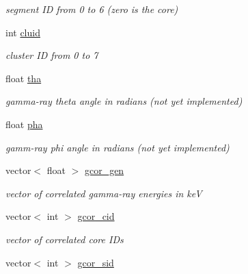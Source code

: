 \begin{DoxyCompactItemize}
\begin{DoxyCompactList}\small\item\em segment I\-D from 0 to 6 (zero is the core) \end{DoxyCompactList}\item 
\hypertarget{classg__clx_af057b9309517174aa3f45d0357b594e0}{int \hyperlink{classg__clx_af057b9309517174aa3f45d0357b594e0}{cluid}}\label{classg__clx_af057b9309517174aa3f45d0357b594e0}

\begin{DoxyCompactList}\small\item\em cluster I\-D from 0 to 7 \end{DoxyCompactList}\item 
\hypertarget{classg__clx_a1add23d784b2694a2f680b855480d95f}{float \hyperlink{classg__clx_a1add23d784b2694a2f680b855480d95f}{tha}}\label{classg__clx_a1add23d784b2694a2f680b855480d95f}

\begin{DoxyCompactList}\small\item\em gamma-\/ray theta angle in radians (not yet implemented) \end{DoxyCompactList}\item 
\hypertarget{classg__clx_affd7b8c1191e11bab79d77dfb4f16a63}{float \hyperlink{classg__clx_affd7b8c1191e11bab79d77dfb4f16a63}{pha}}\label{classg__clx_affd7b8c1191e11bab79d77dfb4f16a63}

\begin{DoxyCompactList}\small\item\em gamm-\/ray phi angle in radians (not yet implemented) \end{DoxyCompactList}\item 
\hypertarget{classg__clx_ae3b41efe9dfca0e33b8bba9e737ee421}{vector$<$ float $>$ \hyperlink{classg__clx_ae3b41efe9dfca0e33b8bba9e737ee421}{gcor\-\_\-gen}}\label{classg__clx_ae3b41efe9dfca0e33b8bba9e737ee421}

\begin{DoxyCompactList}\small\item\em vector of correlated gamma-\/ray energies in ke\-V \end{DoxyCompactList}\item 
\hypertarget{classg__clx_a0aed9e2ec9d94795c86a00c51d940652}{vector$<$ int $>$ \hyperlink{classg__clx_a0aed9e2ec9d94795c86a00c51d940652}{gcor\-\_\-cid}}\label{classg__clx_a0aed9e2ec9d94795c86a00c51d940652}

\begin{DoxyCompactList}\small\item\em vector of correlated core I\-Ds \end{DoxyCompactList}\item 
\hypertarget{classg__clx_a10ddb8a6039959138b145dec9979a216}{vector$<$ int $>$ \hyperlink{classg__clx_a10ddb8a6039959138b145dec9979a216}{gcor\-\_\-sid}}\label{classg__clx_a10ddb8a6039959138b145dec9979a216}


\end{DoxyCompactItemize}
